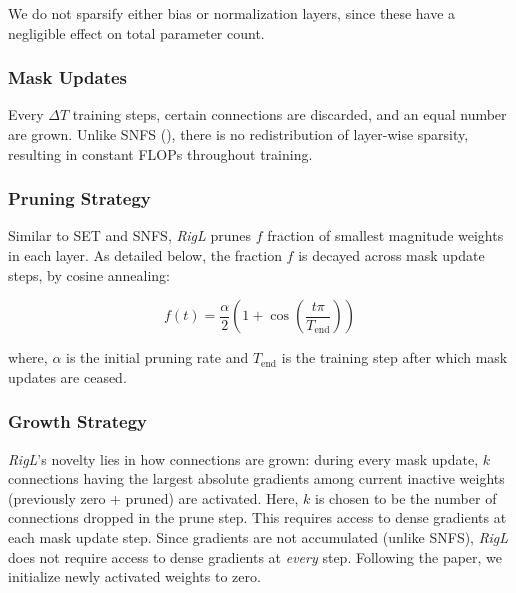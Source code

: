 We do not sparsify either bias or normalization layers, since these have a negligible effect on total parameter count.

\subsubsection{Mask Updates} Every $\Delta T$ training steps, certain connections are discarded, and an equal number are grown. Unlike SNFS (\citet{dettmers2020sparse}), there is no redistribution of layer-wise sparsity, resulting in constant FLOPs throughout training.

\subsubsection{Pruning Strategy} Similar to SET and SNFS, \textit{RigL} prunes $f$ fraction of smallest magnitude weights in each layer.  As detailed below, the fraction $f$ is decayed across mask update steps, by cosine annealing:

\begin{equation}
        f(t) = \frac{\alpha}{2} \left(1 + \cos \left(\frac{t\pi}{T_\text{end}} \right) \right)
\end{equation}

where, $\alpha$ is the initial pruning rate and $T_\text{end}$ is the training step after which mask updates are ceased.

\subsubsection{Growth Strategy} \textit{RigL}'s novelty lies in how connections are grown: during every mask update, $k$ connections having the largest absolute gradients among current inactive weights (previously zero + pruned) are activated. Here, $k$ is chosen to be the number of connections dropped in the prune step. This requires access to dense gradients at each mask update step. Since gradients are not accumulated (unlike SNFS), \textit{RigL} does not require access to dense gradients at \textit{every} step. Following the paper, we initialize newly activated weights to zero.

